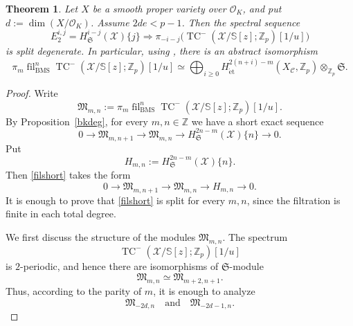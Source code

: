 \documentclass[11pt]{amsart}
\newtheorem{thm}[lemma]{Theorem}
\numberwithin{equation}{section}
\newcommand{\Z}{\mathbb{Z}}
\newcommand{\sC}{\mathcal{C}}
\newcommand{\sO}{\mathcal{O}}
\newcommand{\sX}{\mathcal{X}}
\newcommand{\mf}{\mathfrak}
\newcommand{\fM}{\mf{M}}
\newcommand{\et}{{\operatorname{\acute{e}t}}}
\newcommand{\fil}{{\operatorname{fil}}}
\newcommand{\BMS}{\mathrm{BMS}}
\newcommand{\mS}{\mf{S}}
\numberwithin{equation}{section}
\newcommand{\TCn}{\operatorname{TC}^{-}}
\newcommand{\bS}{\mathbb{S}}
\begin{document}
\begin{thm}\label{bksplit}
Let $X$ be a smooth proper variety over $\sO_K$, and put $d:=\dim(X/\sO_K)$. Assume $2de<p-1$. Then the spectral sequence
\[
  E_2^{i,j}
  =
  H_{\mS}^{i-j}(\sX)\{j\}
  \Longrightarrow
  \pi_{-i-j}\bigl(
    \TCn(\sX/\bS[z];\Z_p)[1/u]
  \bigr)
\]
is split degenerate. In particular, using \cite[Theorem 5.11]{M21}, there is an abstract
isomorphism
\[
  \pi_m\fil_{\BMS}^n
  \TCn(\sX/\bS[z];\Z_p)[1/u]
  \simeq
  \bigoplus_{i\geq 0}
  H_{\et}^{2(n+i)-m}(X_{\sC},\Z_p)
  \otimes_{\Z_p}\mS .
\]
\end{thm}

\begin{proof}
Write
\[
  \fM_{m,n}:=
  \pi_m\fil_{\BMS}^n
  \TCn(\sX/\bS[z];\Z_p)[1/u].
\]
By Proposition~\ref{bkdeg}, for every $m,n\in\Z$ we have a short exact
sequence
\begin{equation}\label{filshort}
  0
  \to
  \fM_{m,n+1}
  \to
  \fM_{m,n}
  \to
  H_{\mS}^{2n-m}(\sX)\{n\}
  \to
  0.
\end{equation}
Put
\[
  H_{m,n}:=H_{\mS}^{2n-m}(\sX)\{n\}.
\]
Then \eqref{filshort} takes the form
\begin{equation}\label{Mrow}
  0
  \to
  \fM_{m,n+1}
  \to
  \fM_{m,n}
  \to
  H_{m,n}
  \to
  0.
\end{equation}
It is enough to prove that \eqref{filshort} is split for every
$m,n$, since the filtration is finite in each total degree.

We first discuss the structure of the modules $\fM_{m,n}$.  The spectrum
\[
  \TCn(\sX/\bS[z];\Z_p)[1/u]
\]
is $2$-periodic, and hence there are isomorphisms of $\mS$-module
\begin{equation}\label{period}
  \fM_{m,n}\simeq \fM_{m+2,n+1}.
\end{equation}
Thus, according to the parity of $m$, it is enough to analyze
\[
  \fM_{-2d,n}
  \quad\text{and}\quad
  \fM_{-2d-1,n}.
\]


\end{proof}
\end{document}
